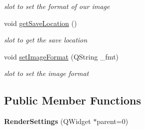 \begin{DoxyCompactItemize}
\begin{DoxyCompactList}\small\item\em slot to set the format of our image \end{DoxyCompactList}\item 
\hypertarget{class_render_settings_a5ba7d0bc90cc8c01c360a40c544c68ab}{void \hyperlink{class_render_settings_a5ba7d0bc90cc8c01c360a40c544c68ab}{get\-Save\-Location} ()}\label{class_render_settings_a5ba7d0bc90cc8c01c360a40c544c68ab}

\begin{DoxyCompactList}\small\item\em slot to get the save location \end{DoxyCompactList}\item 
\hypertarget{class_render_settings_a5c728a358d8f35b7bfe94cb985903ad3}{void \hyperlink{class_render_settings_a5c728a358d8f35b7bfe94cb985903ad3}{set\-Image\-Format} (Q\-String \-\_\-fmt)}\label{class_render_settings_a5c728a358d8f35b7bfe94cb985903ad3}

\begin{DoxyCompactList}\small\item\em slot to set the image format \end{DoxyCompactList}\end{DoxyCompactItemize}
\subsection*{Public Member Functions}
\begin{DoxyCompactItemize}
\item 
\hypertarget{class_render_settings_a654a9887808f8fc4b3b9dc1b5ac94580}{{\bfseries Render\-Settings} (Q\-Widget $\ast$parent=0)}\label{class_render_settings_a654a9887808f8fc4b3b9dc1b5ac94580}

\end{DoxyCompactItemize}
